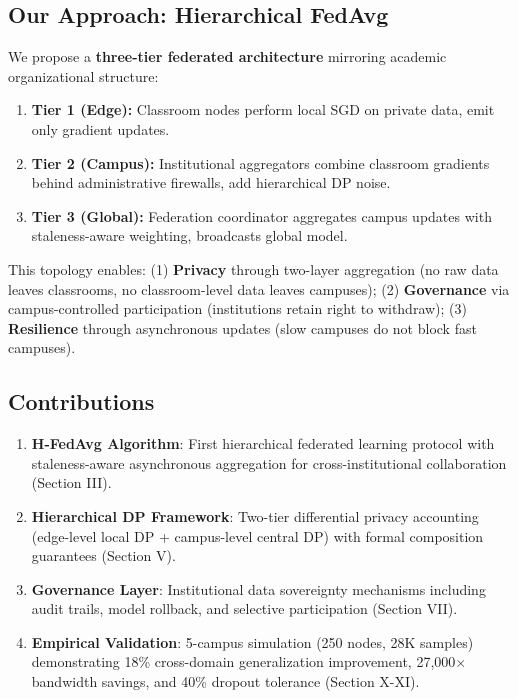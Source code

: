 \documentclass[conference]{IEEEtran}
\begin{document}
\subsection{Our Approach: Hierarchical FedAvg}

We propose a \textbf{three-tier federated architecture} mirroring academic organizational structure:

\begin{enumerate}
    \item \textbf{Tier 1 (Edge):} Classroom nodes perform local SGD on private data, emit only gradient updates.
    \item \textbf{Tier 2 (Campus):} Institutional aggregators combine classroom gradients behind administrative firewalls, add hierarchical DP noise.
    \item \textbf{Tier 3 (Global):} Federation coordinator aggregates campus updates with staleness-aware weighting, broadcasts global model.
\end{enumerate}

This topology enables: (1) \textbf{Privacy} through two-layer aggregation (no raw data leaves classrooms, no classroom-level data leaves campuses); (2) \textbf{Governance} via campus-controlled participation (institutions retain right to withdraw); (3) \textbf{Resilience} through asynchronous updates (slow campuses do not block fast campuses).

\subsection{Contributions}

\begin{enumerate}
    \item \textbf{H-FedAvg Algorithm}: First hierarchical federated learning protocol with staleness-aware asynchronous aggregation for cross-institutional collaboration (Section III).
    \item \textbf{Hierarchical DP Framework}: Two-tier differential privacy accounting (edge-level local DP + campus-level central DP) with formal composition guarantees (Section V).
    \item \textbf{Governance Layer}: Institutional data sovereignty mechanisms including audit trails, model rollback, and selective participation (Section VII).
    \item \textbf{Empirical Validation}: 5-campus simulation (250 nodes, 28K samples) demonstrating 18\% cross-domain generalization improvement, 27,000$\times$ bandwidth savings, and 40\% dropout tolerance (Section X-XI).
\end{enumerate}
\end{document}
